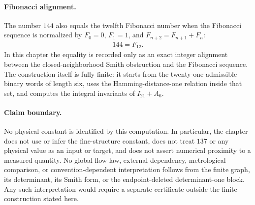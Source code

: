 \paragraph{Fibonacci alignment.}
The number $144$ also equals the twelfth Fibonacci number when the Fibonacci sequence is normalized by $F_0=0$, $F_1=1$, and $F_{n+2}=F_{n+1}+F_n$:
$$
\begin{aligned}
144=F_{12}.
\end{aligned}
$$
In this chapter the equality is recorded only as an exact integer alignment between the closed-neighborhood Smith obstruction and the Fibonacci sequence. The construction itself is fully finite: it starts from the twenty-one admissible binary words of length six, uses the Hamming-distance-one relation inside that set, and computes the integral invariants of $I_{21}+A_6$.

\paragraph{Claim boundary.}
No physical constant is identified by this computation. In particular, the chapter does not use or infer the fine-structure constant, does not treat $137$ or any physical value as an input or target, and does not assert numerical proximity to a measured quantity. No global flow law, external dependency, metrological comparison, or convention-dependent interpretation follows from the finite graph, its determinant, its Smith form, or the endpoint-deleted determinant-one block. Any such interpretation would require a separate certificate outside the finite construction stated here.
